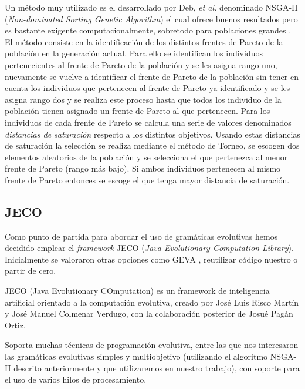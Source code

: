 Un método muy utilizado es el desarrollado por Deb, \textit{et al.} denominado NSGA-II (\textit{Non-dominated Sorting Genetic Algorithm}) el cual ofrece buenos resultados pero es bastante exigente computacionalmente, sobretodo para poblaciones grandes \cite{deb2002fast}. El método consiste en la identificación de los distintos frentes de Pareto de la población en la generación actual. Para ello se identifican los individuos pertenecientes al frente de Pareto de la población y se les asigna rango uno, nuevamente se vuelve a identificar el frente de Pareto de la población sin tener en cuenta los individuos que pertenecen al frente de Pareto ya identificado y se les asigna rango dos y se realiza este proceso hasta que todos los individuo de la población tienen asignado un frente de Pareto al que pertenecen. Para los individuos de cada frente de Pareto se calcula una serie de valores denominados \textit{distancias de saturación} respecto a los distintos objetivos. Usando estas distancias de saturación la selección se realiza mediante el método de Torneo, se escogen dos elementos aleatorios de la población y se selecciona el que pertenezca al menor frente de Pareto (rango más bajo). Si ambos individuos pertenecen al mismo frente de Pareto entonces se escoge el que tenga mayor distancia de saturación.

\subsection{JECO}
Como punto de partida para abordar el uso de gramáticas evolutivas hemos decidido emplear el \textit{framework} JECO \cite{jecoGit} (\textit{Java Evolutionary Computation Library}). Inicialmente se valoraron otras opciones como  GEVA \cite{gevaGit}, reutilizar código nuestro o partir de cero.

JECO (Java Evolutionary COmputation) es un framework de inteligencia artificial orientado a la computación evolutiva, creado por José Luis Risco Martín y José Manuel Colmenar Verdugo, con la colaboración posterior de Josué Pagán Ortiz.

Soporta muchas técnicas de programación evolutiva, entre las que nos interesaron las gramáticas evolutivas simples y multiobjetivo (utilizando el algoritmo NSGA-II descrito anteriormente y que utilizaremos en nuestro trabajo), con soporte para el uso de varios hilos de procesamiento.
